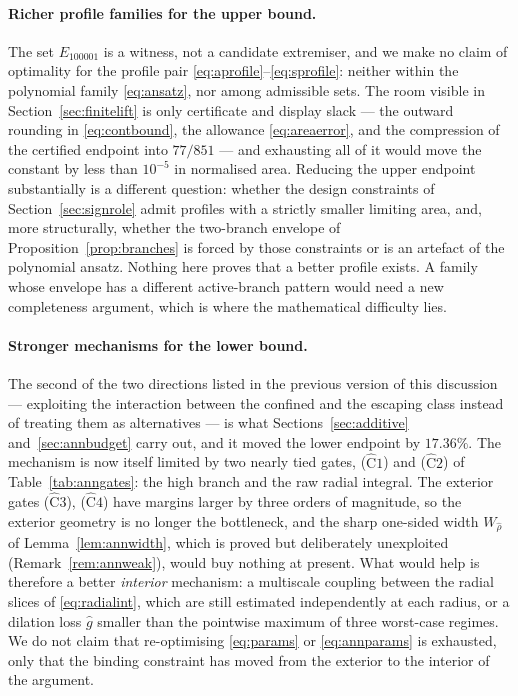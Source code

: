 \documentclass[11pt]{article}
\theoremstyle{plain}
\theoremstyle{definition}
\theoremstyle{remark}
\begin{document}
\paragraph{Richer profile families for the upper bound.} The set $E_{100001}$ is
a witness, not a candidate extremiser, and we make no claim of optimality for
the profile pair \eqref{eq:aprofile}--\eqref{eq:sprofile}: neither within the
polynomial family \eqref{eq:ansatz}, nor among admissible sets. The room visible in
Section~\ref{sec:finitelift} is only certificate and display slack --- the
outward rounding in \eqref{eq:contbound}, the allowance
\eqref{eq:areaerror}, and the compression of the certified endpoint into
$77/851$ --- and exhausting all of it would move the constant by less than
$10^{-5}$ in normalised area. Reducing the upper endpoint substantially is a
different question: whether the design constraints of
Section~\ref{sec:signrole} admit profiles with a strictly smaller limiting
area, and, more structurally, whether the two-branch envelope of
Proposition~\ref{prop:branches} is forced by those constraints or is an artefact
of the polynomial ansatz. Nothing here proves that a better profile exists. A family whose envelope
has a different active-branch pattern would need a new completeness argument,
which is where the mathematical difficulty lies.

\paragraph{Stronger mechanisms for the lower bound.} The second of the two
directions listed in the previous version of this discussion --- exploiting the
interaction between the confined and the escaping class instead of treating them
as alternatives --- is what
Sections~\ref{sec:additive} and~\ref{sec:annbudget} carry out, and it moved the
lower endpoint by $17.36\%$. The mechanism is now itself limited by two nearly
tied gates, ($\widehat{\mathrm{C}}1$) and ($\widehat{\mathrm{C}}2$) of
Table~\ref{tab:anngates}: the high branch and the raw radial integral. The
exterior gates ($\widehat{\mathrm{C}}3$), ($\widehat{\mathrm{C}}4$) have margins
larger by three orders of magnitude, so the exterior geometry is no longer the
bottleneck, and the sharp one-sided width $W_{\hat\rho}$ of
Lemma~\ref{lem:annwidth}, which is proved but deliberately unexploited
(Remark~\ref{rem:annweak}), would buy nothing at present. What would help is
therefore a better \emph{interior} mechanism: a multiscale coupling between the
radial slices of \eqref{eq:radialint}, which are still estimated independently
at each radius, or a dilation loss $\hat g$ smaller than the pointwise maximum
of three worst-case regimes. We do not claim that re-optimising
\eqref{eq:params} or \eqref{eq:annparams} is exhausted, only that the binding
constraint has moved from the exterior to the interior of the argument.
\end{document}
